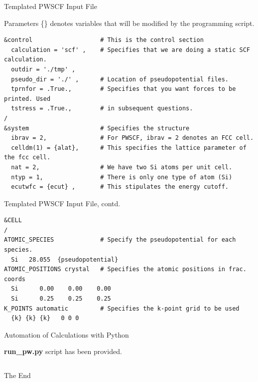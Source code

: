 \documentclass[aspectratio=169]{beamer}
\begin{document}
\begin{frame}[fragile]{Templated PWSCF Input File}

\begin{alertblock}{Parameters}
\{\} denotes variables that will be modified by the programming script.
\end{alertblock}

\footnotesize
\begin{verbatim}
&control                   # This is the control section
  calculation = 'scf' ,    # Specifies that we are doing a static SCF calculation.
  outdir = './tmp' ,
  pseudo_dir = './' ,      # Location of pseudopotential files.
  tprnfor = .True.,        # Specifies that you want forces to be printed. Used
  tstress = .True.,        # in subsequent questions.
/
&system                    # Specifies the structure
  ibrav = 2,               # For PWSCF, ibrav = 2 denotes an FCC cell.
  celldm(1) = {alat},      # This specifies the lattice parameter of the fcc cell.
  nat = 2,                 # We have two Si atoms per unit cell.
  ntyp = 1,                # There is only one type of atom (Si)
  ecutwfc = {ecut} ,       # This stipulates the energy cutoff.
\end{verbatim}


\end{frame} 


\begin{frame}[fragile]{Templated PWSCF Input File, contd.}
\footnotesize
\begin{verbatim}
&CELL
/
ATOMIC_SPECIES             # Specify the pseudopotential for each species.
  Si   28.055  {pseudopotential}
ATOMIC_POSITIONS crystal   # Specifies the atomic positions in frac. coords
  Si      0.00    0.00    0.00
  Si      0.25    0.25    0.25
K_POINTS automatic         # Specifies the k-point grid to be used
  {k} {k} {k}   0 0 0
\end{verbatim}

\end{frame} 

\begin{frame}[fragile]{Automation of Calculations with Python}

\textbf{run\_pw.py} script has been provided.

\inputminted{python}{Lab_2_code.py}

\end{frame} 

%     
%     

\begin{frame}
    \Huge{\centerline{The End}}
\end{frame}
\end{document}

